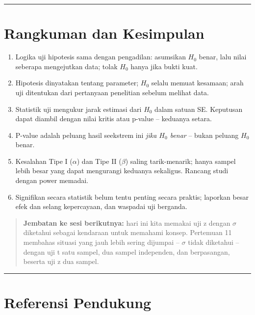 \documentclass[
  indonesian,
  letterpaper,
]{book}
\providecommand{\tightlist}{%
  \setlength{\itemsep}{0pt}\setlength{\parskip}{0pt}}
\begin{document}
\begin{center}\rule{0.5\linewidth}{0.5pt}\end{center}


\chapter{Rangkuman dan Kesimpulan}\label{rangkuman-dan-kesimpulan-1}

\begin{enumerate}
\def\labelenumi{\arabic{enumi}.}
\tightlist
\item
  Logika uji hipotesis sama dengan pengadilan: asumsikan \(H_0\) benar,
  lalu nilai seberapa mengejutkan data; tolak \(H_0\) hanya jika bukti
  kuat.
\item
  Hipotesis dinyatakan tentang parameter; \(H_0\) selalu memuat
  kesamaan; arah uji ditentukan dari pertanyaan penelitian sebelum
  melihat data.
\item
  Statistik uji mengukur jarak estimasi dari \(H_0\) dalam satuan SE.
  Keputusan dapat diambil dengan nilai kritis atau p-value -- keduanya
  setara.
\item
  P-value adalah peluang hasil seekstrem ini \emph{jika \(H_0\) benar}
  -- bukan peluang \(H_0\) benar.
\item
  Kesalahan Tipe I (\(\alpha\)) dan Tipe II (\(\beta\)) saling
  tarik-menarik; hanya sampel lebih besar yang dapat mengurangi keduanya
  sekaligus. Rancang studi dengan power memadai.
\item
  Signifikan secara statistik belum tentu penting secara praktis;
  laporkan besar efek dan selang kepercayaan, dan waspadai uji berganda.
\end{enumerate}

\begin{quote}
\textbf{Jembatan ke sesi berikutnya:} hari ini kita memakai uji z dengan
\(\sigma\) diketahui sebagai kendaraan untuk memahami konsep. Pertemuan
11 membahas situasi yang jauh lebih sering dijumpai -- \(\sigma\) tidak
diketahui -- dengan uji t satu sampel, dua sampel independen, dan
berpasangan, beserta uji z dua sampel.
\end{quote}

\begin{center}\rule{0.5\linewidth}{0.5pt}\end{center}


\chapter{Referensi Pendukung}\label{referensi-pendukung-1}
\end{document}
